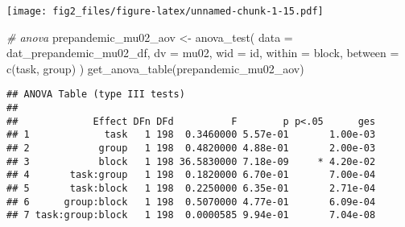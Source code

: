 \documentclass[
]{article}
\newenvironment{Shaded}{\begin{snugshade}}{\end{snugshade}}
\newcommand{\AttributeTok}[1]{\textcolor[rgb]{0.77,0.63,0.00}{#1}}
\newcommand{\CommentTok}[1]{\textcolor[rgb]{0.56,0.35,0.01}{\textit{#1}}}
\newcommand{\FunctionTok}[1]{\textcolor[rgb]{0.00,0.00,0.00}{#1}}
\newcommand{\NormalTok}[1]{#1}
\newcommand{\OtherTok}[1]{\textcolor[rgb]{0.56,0.35,0.01}{#1}}
\begin{document}
\texttt{[image: fig2\_files/figure-latex/unnamed-chunk-1-15.pdf]}

\begin{Shaded}
\begin{Highlighting}[]
\CommentTok{\# anova}
\NormalTok{prepandemic\_mu02\_aov }\OtherTok{\textless{}{-}} \FunctionTok{anova\_test}\NormalTok{(}
  \AttributeTok{data =}\NormalTok{ dat\_prepandemic\_mu02\_df, }\AttributeTok{dv =}\NormalTok{ mu02, }\AttributeTok{wid =}\NormalTok{ id,}
  \AttributeTok{within =}\NormalTok{ block, }\AttributeTok{between =} \FunctionTok{c}\NormalTok{(task, group)}
\NormalTok{)}
\FunctionTok{get\_anova\_table}\NormalTok{(prepandemic\_mu02\_aov)}
\end{Highlighting}
\end{Shaded}

\begin{verbatim}
## ANOVA Table (type III tests)
## 
##             Effect DFn DFd          F        p p<.05      ges
## 1             task   1 198  0.3460000 5.57e-01       1.00e-03
## 2            group   1 198  0.4820000 4.88e-01       2.00e-03
## 3            block   1 198 36.5830000 7.18e-09     * 4.20e-02
## 4       task:group   1 198  0.1820000 6.70e-01       7.00e-04
## 5       task:block   1 198  0.2250000 6.35e-01       2.71e-04
## 6      group:block   1 198  0.5070000 4.77e-01       6.09e-04
## 7 task:group:block   1 198  0.0000585 9.94e-01       7.04e-08
\end{verbatim}
\end{document}
